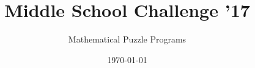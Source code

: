 \documentclass{puzzlehunt}
\title{Middle School Challenge '17}
\author{Mathematical Puzzle Programs}
\date{\today}
\begin{document}
\frontmatter %

\phTitlePage %
\phTableOfContents %


\mainmatter %

% 


















\end{document}
